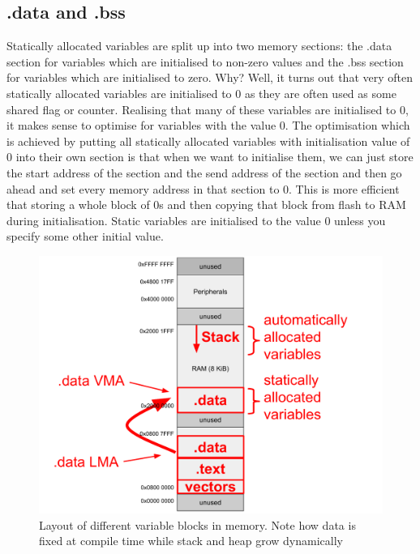 \subsection{.data and .bss}
Statically allocated variables are split up into two memory sections: the .data section for variables which are initialised to non-zero values and the .bss section for variables which are initialised to zero.
Why? Well, it turns out that very often statically allocated variables are initialised to 0 as they are often used as some shared flag or counter. 
Realising that many of these variables are initialised to 0, it makes sense to optimise for variables with the value 0.
The optimisation which is achieved by putting all statically allocated variables with initialisation value of 0 into their own section is that when we want to initialise them, we can just store the start address of the section and the send address of the section and then go ahead and set every memory address in that section to 0.
This is more efficient that storing a whole block of 0s and then copying that block from flash to RAM during initialisation. 
Static variables are initialised to the value 0 unless you specify some other initial value.

\begin{figure}
    \centering
    \includegraphics[scale=0.7]{./fig/variable-layout.pdf}
    \caption{Layout of different variable blocks in memory. Note how data is fixed at compile time while stack and heap grow dynamically}
    \label{fig:mem_allocation}
\end{figure}

